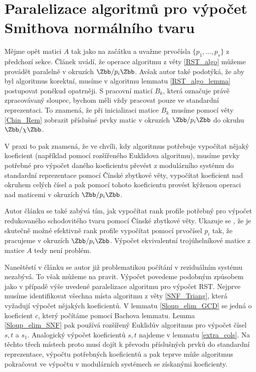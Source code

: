 \section{Paralelizace algoritmů pro výpočet Smithova normálního tvaru}
Mějme opět matici $ A $ tak jako na začátku a uvažme prvočísla
$ \{ p_1, \dots, p_s \} $ z předchozí sekce. Článek \cite[Theorem 16]{triang}
uvádí, že operace algoritmu z věty \ref{RST_algo} můžeme provádět paralelně
v okruzích $ \Zbb / p_i \Zbb $. Avšak autor také podotýká, že aby byl algoritmus
korektní, musíme v algoritmu lemmatu \ref{RST_algo_lemma} postupovat poněkud
opatrněji. S pracovní maticí $ B_k $, která označuje právě zpracovávaný sloupec,
bychom měli vždy pracovat pouze ve standardní reprezentaci. To znamená, že při
inicializaci matice $ B_k $ musíme pomocí věty \ref{Chin_Rem} zobrazit příslušné
prvky matic v okruzích $ \Zbb / p_i \Zbb $ do okruhu $ \Zbb / \chi \Zbb $.

V praxi to pak znamená, že ve chvíli, kdy algoritmus potřebuje vypočítat nějaký
koeficient (například pomocí rozšířeného Euklidova algoritmu), musíme prvky
potřebné pro výpočet daného koeficientu převést z modulárního systému do standardní
reprezentace pomocí Čínské zbytkové věty, vypočítat koeficient nad okruhem celých
čísel a pak pomocí tohoto koeficientu provést kýženou operaci nad maticemi v
okruzích $ \Zbb / p_i \Zbb $.

Autor článku \cite{triang} se
také zabývá tím, jak vypočítat rank profile potřebný pro výpočet redukovaného
schodovitého tvaru pomocí Čínské zbytkové věty. Ukazuje se \cite[Theorem 15]{triang},
že je skutečně možné efektivně rank profile vypočítat pomocí prvočísel $ p_i $
tak, že pracujeme v okruzích $ \Zbb / p_i \Zbb $.
Výpočet ekvivalentní trojúhelníkové matice z matice $ A $ tedy není problém.

Naneštěstí v článku \cite{SNF_Arne} se autor již problematikou počítání v
reziduálním systému nezabývá. To však můžeme na
pravit. Výpočet povedeme podobným
způsobem jako v případě výše uvedené paralelizace algoritmu pro výpočet RST.
Nejprve musíme identifikovat všechna místa algoritmu z věty \ref{SNF_Triang},
která vyžadují výpočet nějakých koeficientů. V lemmatu \ref{Sloup_elim_GCD}
se jedná o koeficient $ c $, který počítáme pomocí Bachova lemmatu. Lemma
\ref{Sloup_elim_SNF} pak používá rozšířený Euklidův algoritmus pro výpočet čísel
$ s, t $ a $ s_1 $. Analogický výpočet koeficientů $ s, t $ najdeme v lemmatu
\ref{extra_cols}. Na těchto třech místech proto musí dojít k
převodu příslušných prvků do standardní reprezentace, výpočtu potřebných
koeficientů a pak teprve může algoritmus pokračovat ve výpočtu v modulárních
systémech se získanými koeficienty.


